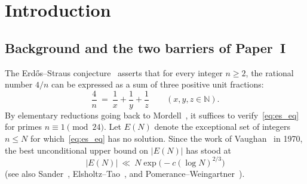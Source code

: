 \documentclass[11pt, a4paper]{article}
\theoremstyle{plain}
\theoremstyle{definition}
\newcommand{\N}{\mathbb{N}}
\newcommand{\Z}{\mathbb{Z}}
\newcommand{\leg}[2]{\left(\frac{#1}{#2}\right)}
\begin{document}
\begin{abstract}
In the final part of the paper (Sections~\ref{sec:bilinear_dispersion}--\ref{sec:toric_volume_barrier} and Appendix~\ref{app:audit}), we study bilinear Kloosterman dispersion on the affine threefold $\mathcal{V}_n:\,4uavw-4u^{2}v-w=n$ and the multiplicative difference sets $D(K_c)=\Sigma(K_c)\cdot\Sigma(K_c)^{-1}\subseteq(\Z/c\Z)^{\times}$ for $K_c=(n+c)/4$. On $\mathcal{V}_n$, we establish a false-positive-free bilinear equivalence, three-term stationary-phase separation at the square-root scale, archimedean slice conservation, and exact Farey-diagonal $L^{2}$-dispersion over $n\sim N$ at power scale $S=4UAV\le N^{1/2-\varepsilon}$. On $D(K_c)$, we prove difference-set positivity duality, unconditional $(\log P)^{4}$ cumulative main-term growth paired with exact small-LCM divisor cancellation, the cyclic quotient parity identity with Bohr--Siegel obstruction certificates, universal factor reciprocity $\leg{q}{p}=\leg{q}{n}$, an ambient $\frac{1}{k!}$ cross-polytope volume bound, deterministic Kneser and spectral saturation criteria, and a Linnik--Xylouris witness-depth lower bound along an infinite sequence of primes. Appendix~\ref{app:audit} establishes unconditional sieved candidate abundance, divergence of the square-free main term via the Rosser--Iwaniec linear sieve, and complete finite square-divisor positivity certificates ($b\mid h^{2}$). These main-term estimates do not by themselves imply positivity of the divisor-encounter count: the Transversal Hypothesis~T and the signed spectral error targets~\eqref{aud:target17} and~\eqref{aud:target76} remain open, and conditional finiteness holds only beyond a threshold $N_{\ast}$ supplied by that hypothesis, which is not determined by the ambient factorial volume calculation.
\end{abstract}

\section{Introduction}\label{sec:intro}

\subsection{Background and the two barriers of Paper~I}\label{subsec:background}

The Erd\H{o}s--Straus conjecture~\cite{erdos_straus} asserts that for every integer $n\ge 2$, the rational number $4/n$ can be expressed as a sum of three positive unit fractions:
\begin{equation}\label{eq:es_eq}
\frac{4}{n}\ =\ \frac{1}{x}+\frac{1}{y}+\frac{1}{z}\qquad(x,y,z\in\N).
\end{equation}
By elementary reductions going back to Mordell~\cite{mordell1969}, it suffices to verify~\eqref{eq:es_eq} for primes $n\equiv1\pmod{24}$. Let $E(N)$ denote the exceptional set of integers $n\le N$ for which~\eqref{eq:es_eq} has no solution. Since the work of Vaughan~\cite{vaughan1970} in 1970, the best unconditional upper bound on $|E(N)|$ has stood at
\[
|E(N)|\ \ll\ N\exp\!\big(-c(\log N)^{2/3}\big)
\]
(see also Sander~\cite{sander1991,sander1994}, Elsholtz--Tao~\cite{elsholtz2013}, and Pomerance--Weingartner~\cite{pomerance2026}).
\end{document}
